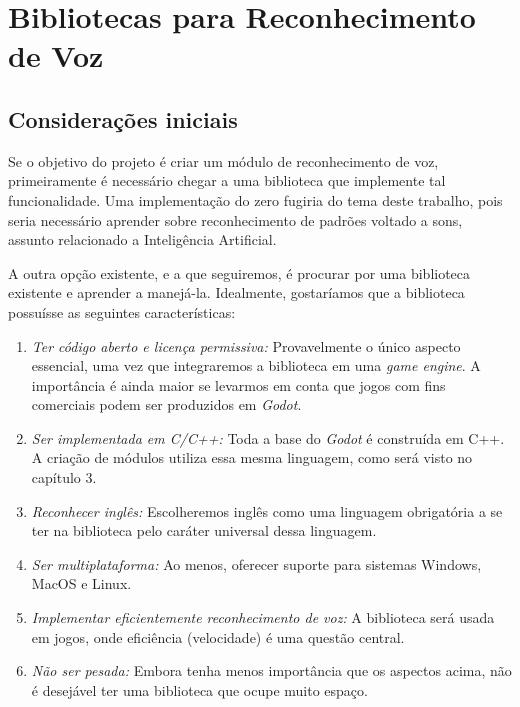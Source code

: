 \chapter{Bibliotecas para Reconhecimento de Voz}
\label{cap:speech-libs}


\section{Considerações iniciais}

Se o objetivo do projeto é criar um módulo de reconhecimento de voz, primeiramente é
necessário chegar a uma biblioteca que implemente tal funcionalidade. Uma
implementação do zero fugiria do tema deste trabalho, pois seria necessário aprender
sobre reconhecimento de padrões voltado a sons, assunto relacionado a Inteligência
Artificial.

A outra opção existente, e a que seguiremos, é procurar por uma biblioteca existente
e aprender a manejá-la. Idealmente, gostaríamos que a biblioteca possuísse as
seguintes características:

\begin{enumerate}
\item \emph{Ter código aberto e licença permissiva:} Provavelmente o único aspecto
essencial, uma vez que integraremos a biblioteca em uma \emph{game engine}. A
importância é ainda maior se levarmos em conta que jogos com fins comerciais podem
ser produzidos em \emph{Godot}.

\item \emph{Ser implementada em C/C++:} Toda a base do \emph{Godot} é construída em
C++. A criação de módulos utiliza essa mesma linguagem, como será visto no capítulo
3.

\item \emph{Reconhecer inglês:} Escolheremos inglês como uma linguagem obrigatória
a se ter na biblioteca pelo caráter universal dessa linguagem.

\item \emph{Ser multiplataforma:} Ao menos, oferecer suporte para sistemas Windows,
MacOS e Linux.

\item \emph{Implementar eficientemente reconhecimento de voz:} A biblioteca será
usada em jogos, onde eficiência (velocidade) é uma questão central.

\item \emph{Não ser pesada:} Embora tenha menos importância que os aspectos acima,
não é desejável ter uma biblioteca que ocupe muito espaço.
\end{enumerate}

